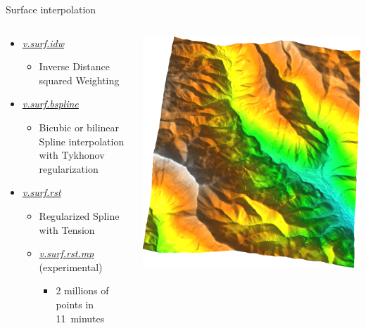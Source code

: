 \documentclass[xcolor={dvipsnames,usenames},beamer,aspectratio=43]{beamer}
\newcommand{\gmodule}[1]{\href{http://grass.osgeo.org/grass71/manuals/#1.html}{\emph{#1}}}
\begin{document}
\begin{frame}{Surface interpolation}

\begin{columns}
\begin{column}{0.5\textwidth}

\begin{itemize}
  \item \gmodule{v.surf.idw}
  \begin{itemize}
    \item Inverse Distance squared Weighting
  \end{itemize}
  \item \gmodule{v.surf.bspline}
  \begin{itemize}
    \item Bicubic or bilinear Spline interpolation with Tykhonov regularization
  \end{itemize}
  \item \gmodule{v.surf.rst}
  \begin{itemize}
    \item Regularized Spline with Tension
    \item \gmodule{v.surf.rst.mp} (experimental)
    \begin{itemize}
      \item 2 millions of points in 11~minutes
    \end{itemize}
  \end{itemize}
\end{itemize}

\end{column}
\begin{column}{0.4\textwidth}

\begin{center}
\includegraphics[width=\textwidth]{features/surface}
\end{center}


\end{column}
\end{columns}
\end{frame}
\end{document}
